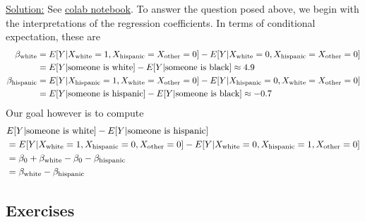 \begin{example}
\noindent
\underline{Solution:} 
See \href{https://colab.research.google.com/drive/1UTUUfWTpmazSa40sqLUWAojRi2kGJM-O?usp=sharing}{colab notebook}. To answer the question posed above, we begin with the interpretations of the regression coefficients. In terms of conditional expectation, these are
\begin{align*}
\beta_{\rm white} &= E[Y|X_{\rm white}=1,X_{\rm hispanic}=X_{\rm other}=0]- E[Y|X_{\rm white}=0,X_{\rm hispanic}=X_{\rm other}=0]\\
&= E[Y|\text{someone is white}]- E[Y|\text{someone is black}] \approx 4.9\\
\beta_{\rm hispanic} &= E[Y|X_{\rm hispanic}=1,X_{\rm white}=X_{\rm other}=0]- E[Y|X_{\rm hispanic}=0,X_{\rm white}=X_{\rm other}=0]\\
&= E[Y|\text{someone is hispanic}]- E[Y|\text{someone is black}]\approx -0.7\\
\end{align*}
Our goal however is to compute 
\begin{align*}
&E[Y|\text{someone is white}]-E[Y|\text{someone is hispanic}] \\
&= E[Y|X_{\rm white}=1,X_{\rm hispanic}=0,X_{\rm other}=0 ]
-E[Y|X_{\rm white}=0,X_{\rm hispanic}=1,X_{\rm other}=0 ]\\
&= \beta_0 + \beta_{\rm white} - \beta_0 - \beta_{\rm hispanic}\\
& = \beta_{\rm white} - \beta_{\rm hispanic}
\end{align*}



\end{example}




\newpage 

\subsection*{Exercises}


